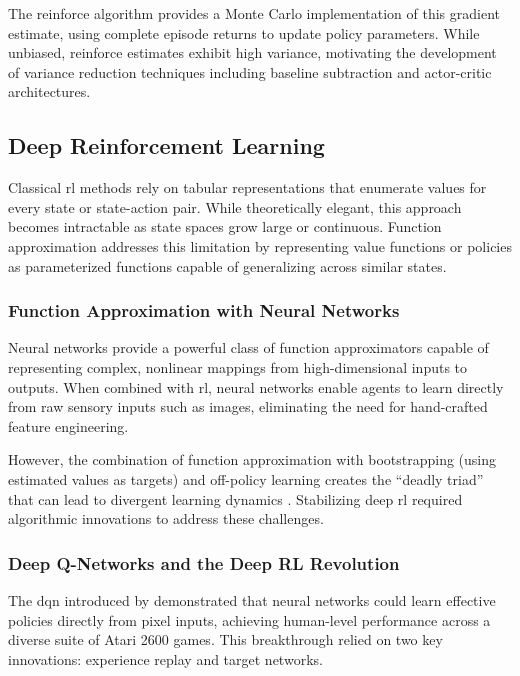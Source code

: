The \gls{reinforce} algorithm \cite{williams1992} provides a 
Monte Carlo implementation of this gradient estimate, 
using complete episode returns to update policy parameters. 
While unbiased, \gls{reinforce} estimates exhibit high variance, 
motivating the development of variance reduction techniques 
including baseline subtraction and actor-critic architectures.

\subsection{Deep Reinforcement Learning}
\label{sec:deep-rl}

Classical \gls{rl} methods rely on tabular representations that enumerate 
values for every state or state-action pair. While theoretically elegant, 
this approach becomes intractable as state spaces grow large or continuous. 
Function approximation addresses this limitation by representing value functions 
or policies as parameterized functions capable of generalizing across similar states.

\subsubsection{Function Approximation with Neural Networks}

Neural networks provide a powerful class of function approximators capable of 
representing complex, nonlinear mappings from high-dimensional inputs to outputs. 
When combined with \gls{rl}, neural networks enable agents to learn directly from raw 
sensory inputs such as images, eliminating the need for hand-crafted feature engineering.

However, the combination of function approximation with bootstrapping 
(using estimated values as targets) and off-policy learning creates the 
``deadly triad'' that can lead to divergent learning dynamics \cite{sutton2018}. 
Stabilizing deep \gls{rl} required algorithmic innovations to address these challenges.

\subsubsection{Deep Q-Networks and the Deep RL Revolution}

The \gls{dqn} introduced by \cite{mnih2013, mnih2015} demonstrated that 
neural networks could learn effective policies directly from pixel inputs, 
achieving human-level performance across a diverse suite of Atari 2600 games. 
This breakthrough relied on two key innovations: experience replay and target networks.


